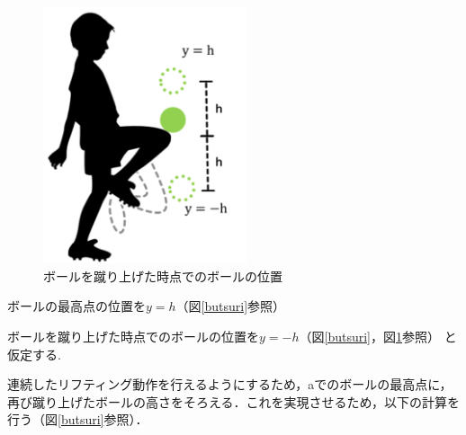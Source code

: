 \begin{figure}[htbp]
    \centering
    \includegraphics[width=6cm]{image/ballenzan.png}
    \caption{ボールを蹴り上げた時点でのボールの位置}
  \label{enzan}
\end{figure}

\vspace{1cm}

ボールの最高点の位置を$y=h$（図\ref{butsuri}参照）

ボールを蹴り上げた時点でのボールの位置を$y=-h$（図\ref{butsuri}，図\ref{enzan}参照）
と仮定する.

連続したリフティング動作を行えるようにするため，aでのボールの最高点に，
再び蹴り上げたボールの高さをそろえる．これを実現させるため，以下の計算を行う（図\ref{butsuri}参照）．


